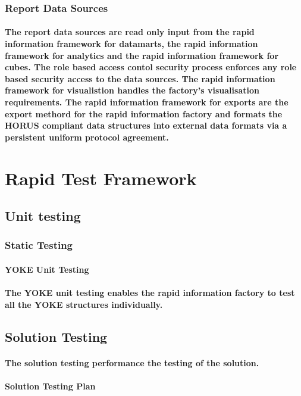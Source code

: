 \documentclass{acm_proc_article-sp}
\begin{document}
\subsubsection{Report Data Sources}
\paragraph{The report data sources are read only input from the rapid information framework for datamarts, the rapid information framework for analytics and the rapid information framework for cubes. The role based access contol security process enforces any role based security access to the data sources. The rapid information framework for visualistion handles the factory's visualisation requirements. The rapid information framework for exports are the export methord for the rapid information factory and formats the HORUS compliant data structures into external data formats via a persistent uniform protocol agreement.}
\newpage
\section{Rapid Test Framework}
\subsection{Unit testing}
\subsubsection{Static Testing}
\paragraph{YOKE Unit Testing}
\paragraph{The YOKE unit testing enables the rapid information factory to test all the YOKE structures individually.}
\subsection{Solution Testing}
\paragraph{The solution testing performance the testing of the solution.}
\paragraph{Solution Testing Plan}
\end{document}
